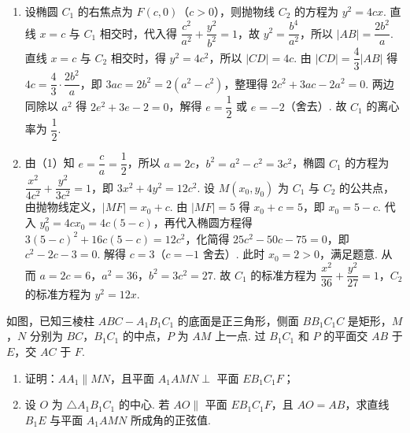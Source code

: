 \begin{solution}
\begin{enumerate}
\item 设椭圆 \(C_1\) 的右焦点为 \(F(c,0)\)（\(c>0\)），则抛物线 \(C_2\) 的方程为 \(y^2=4cx\). 直线 \(x=c\) 与 \(C_1\) 相交时，代入得 \(\dfrac{c^2}{a^2}+\dfrac{y^2}{b^2}=1\)，故 \(y^2=\dfrac{b^4}{a^2}\)，所以 \(|AB|=\dfrac{2b^2}{a}\). 直线 \(x=c\) 与 \(C_2\) 相交时，得 \(y^2=4c^2\)，所以 \(|CD|=4c\). 由 \(|CD|=\dfrac43|AB|\) 得 \(4c=\dfrac43\cdot\dfrac{2b^2}{a}\)，即 \(3ac=2b^2=2(a^2-c^2)\)，整理得 \(2c^2+3ac-2a^2=0\). 两边同除以 \(a^2\) 得 \(2e^2+3e-2=0\)，解得 \(e=\dfrac12\) 或 \(e=-2\)（舍去）. 故 \(C_1\) 的离心率为 \(\dfrac12\).
\item 由（1）知 \(e=\dfrac ca=\dfrac12\)，所以 \(a=2c\)，\(b^2=a^2-c^2=3c^2\)，椭圆 \(C_1\) 的方程为 \(\dfrac{x^2}{4c^2}+\dfrac{y^2}{3c^2}=1\)，即 \(3x^2+4y^2=12c^2\). 设 \(M(x_0,y_0)\) 为 \(C_1\) 与 \(C_2\) 的公共点，由抛物线定义，\(|MF|=x_0+c\). 由 \(|MF|=5\) 得 \(x_0+c=5\)，即 \(x_0=5-c\). 代入 \(y_0^2=4cx_0=4c(5-c)\)，再代入椭圆方程得 \(3(5-c)^2+16c(5-c)=12c^2\)，化简得 \(25c^2-50c-75=0\)，即 \(c^2-2c-3=0\). 解得 \(c=3\)（\(c=-1\) 舍去）. 此时 \(x_0=2>0\)，满足题意. 从而 \(a=2c=6\)，\(a^2=36\)，\(b^2=3c^2=27\). 故 \(C_1\) 的标准方程为 \(\dfrac{x^2}{36}+\dfrac{y^2}{27}=1\)，\(C_2\) 的标准方程为 \(y^2=12x\).
\end{enumerate}
\end{solution}

\begin{problem}
如图，已知三棱柱 \(ABC-A_1B_1C_1\) 的底面是正三角形，侧面 \(BB_1C_1C\) 是矩形，\(M\)，\(N\) 分别为 \(BC\)，\(B_1C_1\) 的中点，\(P\) 为 \(AM\) 上一点. 过 \(B_1C_1\) 和 \(P\) 的平面交 \(AB\) 于 \(E\)，交 \(AC\) 于 \(F\).

\begin{enumerate}
\item 证明：\(AA_1\parallel MN\)，且平面 \(A_1AMN\perp\) 平面 \(EB_1C_1F\)；
\item 设 \(O\) 为 \(\triangle A_1B_1C_1\) 的中心. 若 \(AO\parallel\) 平面 \(EB_1C_1F\)，且 \(AO=AB\)，求直线 \(B_1E\) 与平面 \(A_1AMN\) 所成角的正弦值.
\end{enumerate}

\end{problem}

